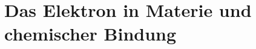 \chapter{Das Elektron in Materie und chemischer Bindung}
\label{chap:elektron-materie-chemische-bindung}









